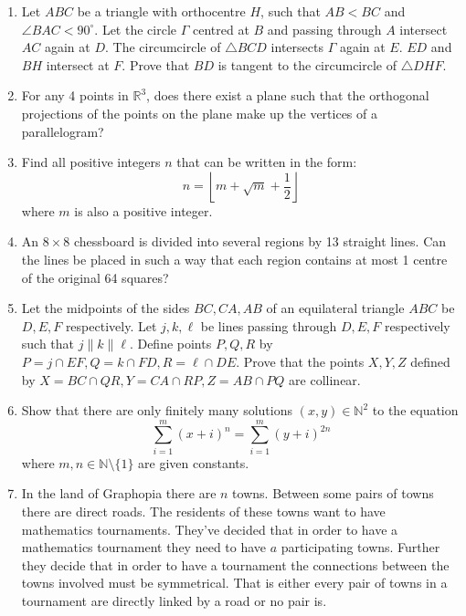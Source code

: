 \documentclass{article}
\begin{document}
\begin{enumerate}

\medskip
\item %
Let $ABC$ be a triangle with orthocentre $H$, such that $AB<BC$ and $\angle BAC < 90^\circ$. Let the circle $\Gamma$ centred at $B$ and passing through $A$ intersect $AC$ again at $D$. The circumcircle of $\triangle BCD$ intersects $\Gamma$ again at $E$. $ED$ and $BH$ intersect at $F$. Prove that $BD$ is tangent to the circumcircle of $\triangle DHF$.


\medskip
\item  %
For any 4 points in $\mathbb{R}^3$, does there exist a plane such that the orthogonal projections of the points on the plane make up the vertices of a parallelogram?


\medskip
\item %
Find all positive integers $n$ that can be written in the form:
$$n = \left\lfloor m + \sqrt{m} + \frac{1}{2} \right\rfloor$$
where $m$ is also a positive integer.


\medskip
\item %
An $8 \times 8$ chessboard is divided into several regions by 13 straight lines. Can the lines be placed in such a way that each region contains at most 1 centre of the original 64 squares?


\medskip
\item %
Let the midpoints of the sides $BC,CA,AB$ of an equilateral triangle $ABC$ be $D,E,F$ respectively. Let $j,k,\ell$ be lines passing through $D,E,F$ respectively such that $j \parallel k \parallel \ell$. Define points $P,Q,R$ by $P= j\cap EF, Q= k \cap FD, R = \ell \cap DE$. Prove that the points $X,Y,Z$ defined by $X = BC\cap QR, Y = CA \cap RP, Z = AB \cap PQ$ are  collinear.


\medskip
\item %
Show that there are only finitely many solutions $(x, y) \in \mathbb{N}^2$ to the equation
$$\sum_{i = 1}^{m} (x + i)^n = \sum_{i = 1}^{m} (y + i)^{2n}$$
where $m, n \in \mathbb{N} \setminus \{1\}$ are given constants.

\medskip
\item %
In the land of Graphopia there are $n$ towns. Between some pairs of towns there are direct roads. The residents of these towns want to have mathematics tournaments. They've decided that in order to have a mathematics tournament they need to have $a$ participating towns. Further they decide that in order to have a tournament the connections between the towns involved must be symmetrical. That is either every pair of towns in a tournament are directly linked by a road or no pair is. 


\end{enumerate}
\end{document}
